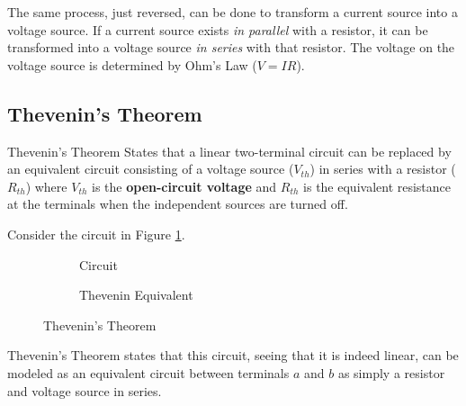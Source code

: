 \documentclass[12pt]{article}
\begin{document}
The same process, just reversed, can be done to transform a current source into a voltage source. If a current source exists \textit{in parallel} with a resistor, it can be transformed into a voltage source \textit{in series} with that resistor. The voltage on the voltage source is determined by Ohm's Law ($V = IR$).

\subsection{Thevenin's Theorem}
\label{ssec:theveninsTheorem}

\begin{definition}{Thevenin's Theorem}
  States that a linear two-terminal circuit can be replaced by an equivalent circuit consisting of a voltage source ($V_{th}$) in series with a resistor ($R_{th}$) where $V_{th}$ is the \textbf{open-circuit voltage} and $R_{th}$ is the equivalent resistance at the terminals when the independent sources are turned off.
\end{definition}

Consider the circuit in Figure \ref{fig:042}.
\begin{figure}[H]
  \centering
  \begin{subfigure}[H]{0.45\textwidth}
    \centering
    
    \caption{Circuit}
    \label{fig:042}
  \end{subfigure}
  \begin{subfigure}[H]{0.45\textwidth}
    \centering
    
    \caption{Thevenin Equivalent}
    \label{fig:043}
  \end{subfigure}
  \caption{Thevenin's Theorem}
  \label{fig:theveninsTheoremOne}
  \vspace{-10pt}
\end{figure}
Thevenin's Theorem states that this circuit, seeing that it is indeed linear, can be modeled as an equivalent circuit between terminals $a$ and $b$ as simply a resistor and voltage source in series.
\end{document}

